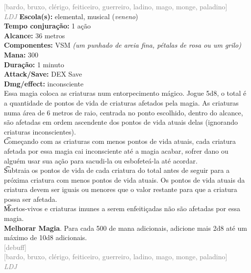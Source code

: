 \documentclass{RPG_Adventure}[2021/10/20]
\begin{document}
{\scriptsize \textcolor{gray}{[bardo, bruxo, clérigo, feiticeiro, guerreiro, ladino, mago, monge, paladino]\\}}
{\tiny \textcolor{gray}{\textit{LDJ}}}
{\small \t \textbf{Escola(s):} elemental, musical (\textit{veneno})\\\t \textbf{Tempo conjuração:} 1 ação\\\t \textbf{Alcance:} 36 metros\\\t \textbf{Componentes:} VSM \textit{(um punhado de areia fina, pétalas de rosa ou um grilo)}\\\t \textbf{Mana:} 300\\\t \textbf{Duração:} 1 minuto\\\t \textbf{Attack/Save:} DEX Save\\\t \textbf{Dmg/effect:} inconsciente\\}
{\normalsize Essa magia coloca as criaturas num entorpecimento mágico. Jogue 5d8, o total é a quantidade de pontos de vida de criaturas afetados pela magia. As criaturas numa área de 6 metros de raio, centrada no ponto escolhido, dentro do alcance, são afetadas em ordem ascendente dos pontos de vida atuais delas (ignorando criaturas inconscientes).\\\t Começando com as criaturas com menos pontos de vida atuais, cada criatura afetada por essa magia cai inconsciente até a magia acabar, sofrer dano ou alguém usar sua ação para sacudi-la ou esbofeteá-la até acordar.\\\t Subtraia os pontos de vida de cada criatura do total antes de seguir para a próxima criatura com menos pontos de vida atuais. Os pontos de vida atuais da criatura devem ser iguais ou menores que o valor restante para que a criatura possa ser afetada.\\\t Mortos-vivos e criaturas imunes a serem enfeitiçadas não são afetadas por essa magia.\\\t \textbf{Melhorar Magia}. Para cada 500 de mana adicionais, adicione mais 2d8 até um máximo de 10d8 adicionais.\\}
{\scriptsize \textcolor{gray}{[debuff]\\}}
{\scriptsize \textcolor{gray}{[bardo, bruxo, clérigo, feiticeiro, guerreiro, ladino, mago, monge, paladino]\\}}
{\tiny \textcolor{gray}{\textit{LDJ}}}
\end{document}
